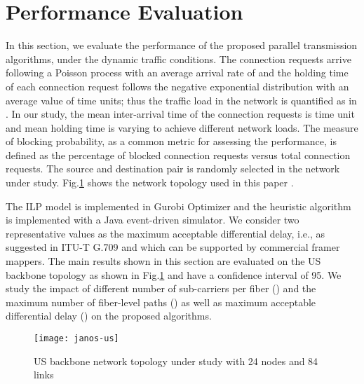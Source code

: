 \documentclass[conference]{IEEEtran}
\begin{document}
\section{Performance Evaluation}\label{performance}
\par In this section, we evaluate the performance of the proposed parallel transmission algorithms, under the dynamic traffic conditions. The connection requests arrive following a Poisson process with an average arrival rate of  and 
the holding time of each connection request follows the negative exponential distribution with an average value of  
time units; thus the traffic load in the network is quantified as  in .  
In our study, the mean inter-arrival time of the connection requests is  time unit and mean holding time is varying 
to achieve different network loads.  The measure of blocking probability, as a common metric for assessing the performance, is defined as the percentage of blocked connection requests versus total connection requests. The source and destination pair is randomly selected in the network 
under study.    Fig.\ref{fig:us} shows the network topology used in this paper \cite{SNDlib}.  


\par The  ILP model  is implemented in Gurobi Optimizer \cite{gurobi} and the heuristic algorithm 
is implemented with a Java event-driven simulator.  
  We consider two representative values as the maximum acceptable differential delay, i.e., 
  as suggested in ITU-T G.709 \cite{ITU-T:G.709}  and  which can be supported by commercial framer 
 mappers\cite{Intel:datasheet}.  The main results shown in this section are evaluated on the US backbone topology as shown in Fig.\ref{fig:us} and  have a confidence interval of 95.      
      We study the impact of different number of sub-carriers per fiber () and  the maximum number of fiber-level paths () as well as maximum acceptable differential delay () on the proposed algorithms.
\begin{figure}
	\centering
	\texttt{[image: janos-us]} 
  \caption{US backbone network topology \cite{SNDlib} under study with 24 nodes and 84 links} \label{fig:us} 
  \vspace{-0.3cm}
 \end{figure} 
\end{document}
